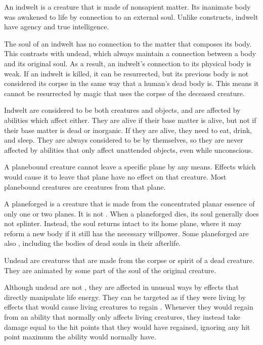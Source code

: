   An indwelt is a creature that is made of nonsapient matter.
  Its inanimate body was awakened to life by connection to an external soul.
  Unlike constructs, indwelt have agency and true intelligence.

  The soul of an indwelt has no connection to the matter that composes its body.
  This contrasts with undead, which always maintain a connection between a body and its original soul.
  As a result, an indwelt's connection to its physical body is weak.
  If an indwelt is killed, it can be resurrected, but its previous body is not considered its corpse in the same way that a human's dead body is.
  This means it cannot be resurrected by magic that uses the corpse of the deceased creature.

  Indwelt are considered to be both creatures and objects, and are affected by abilities which affect either.
  They are alive if their base matter is alive, but not if their base matter is dead or inorganic.
  If they are alive, they need to eat, drink, and sleep.
  They are always considered to be  by themselves, so they are never affected by abilities that only affect unattended objects, even while unconscious.

  A planebound creature cannot leave a specific plane by any means.
  Effects which would cause it to leave that plane have no effect on that creature.
  Most planebound creatures are  creatures from that plane.

  A planeforged is a creature that is made from the concentrated planar essence of only one or two planes.
  It is not .
  When a planeforged dies, its soul generally does not splinter.
  Instead, the soul returns intact to its home plane, where it may reform a new body if it still has the necessary willpower.
  Some planeforged are also , including the bodies of dead souls in their afterlife.

  Undead are creatures that are made from the corpse or spirit of a dead creature.
  They are animated by some part of the soul of the original creature.

  Although undead are not , they are affected in unusual ways by effects that directly manipulate life energy.
  They can be targeted as if they were living  by \magical effects that would cause living creatures to regain .
  Whenever they would regain  from an ability that normally only affects living creatures, they instead take damage equal to the hit points that they would have regained, ignoring any hit point maximum the ability would normally have.

